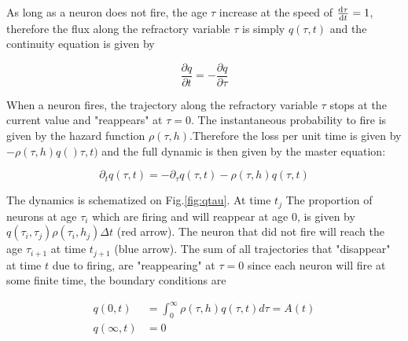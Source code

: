 \documentclass[12pt,twoside]{report}
\def \dd  {{\rm d}}
\begin{document}
As long as a neuron does not fire, the age $\tau$ increase at the speed of $\frac{\dd \tau}{\dd t}=1$, therefore the flux along the refractory variable $\tau$ is simply $q(\tau,t)$ and the continuity equation is given by

\begin{equation}
\label{eq:continuity1}
\frac{\partial q}{\partial t}=-\frac{\partial q}{\partial \tau}
\end{equation}

When a neuron fires, the trajectory along the refractory variable $\tau$ stops at the current value and "reappears" at $\tau=0$. The instantaneous probability to fire is given by the hazard function $\rho(\tau,h)$.Therefore the loss per unit time is given by $-\rho(\tau,h)q()\tau,t)$ and the full dynamic is then given by the master equation:

\begin{equation}
\label{eq:masterequation}
\partial_t q(\tau,t)=-\partial_\tau q(\tau,t)-\rho(\tau,h)q(\tau,t)
\end{equation}


The dynamics is schematized on Fig.\ref{fig:qtau}. At time $t_j$ The proportion of neurons at age $\tau_i$ which are firing and will reappear at age $0$, is given by $q(\tau_i,\tau_j)\rho(\tau_i,h_j)\Delta t$ (red arrow). The neuron that did not fire will reach the age $\tau_{i+1}$ at time $t_{j+1}$ (blue arrow). The sum of all trajectories that "disappear" at time $t$ due to firing, are "reappearing" at $\tau=0$ since each neuron will fire at some finite time, the boundary conditions are

\begin{align}
\label{eq:boundarycondition}
q(0,t)&=\int_{0}^{\infty}\rho(\tau,h)q(\tau,t)d\tau=A(t) \\
q(\infty,t)&=0
\end{align}
\end{document}
